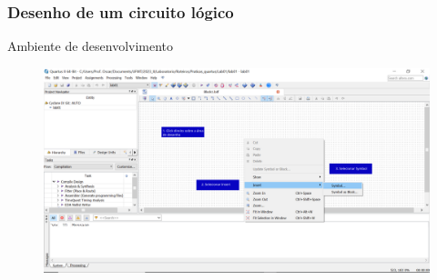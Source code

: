 \documentclass{CPSPresentation}
\begin{document}
\begin{frame}
	\frametitle{Desenho de um circuito lógico}
	
	\begin{block}{}
		\justifying
		Ambiente de desenvolvimento
	\end{block}
	
	\begin{figure}[h]
		\centering
		\includegraphics[width=1.02\textwidth]{quartus/fig05.pdf}
	\end{figure}
	
	
\end{frame}

\end{document}
